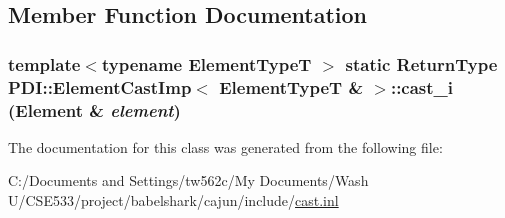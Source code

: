 \subsection{Member Function Documentation}
\hypertarget{class_p_d_i_1_1_element_cast_imp_3_01_element_type_t_01_6_01_4_59c1422de92c7a63ebb0f2587c8baa07}{
\subsubsection[{cast\_\-i}]{\setlength{\rightskip}{0pt plus 5cm}template$<$typename ElementTypeT $>$ static {\bf ReturnType} PDI::ElementCastImp$<$ ElementTypeT \& $>$::cast\_\-i ({\bf Element} \& {\em element})}}
\label{class_p_d_i_1_1_element_cast_imp_3_01_element_type_t_01_6_01_4_59c1422de92c7a63ebb0f2587c8baa07}




The documentation for this class was generated from the following file:\begin{CompactItemize}
\item 
C:/Documents and Settings/tw562c/My Documents/Wash U/CSE533/project/babelshark/cajun/include/\hyperlink{cast_8inl}{cast.inl}\end{CompactItemize}
